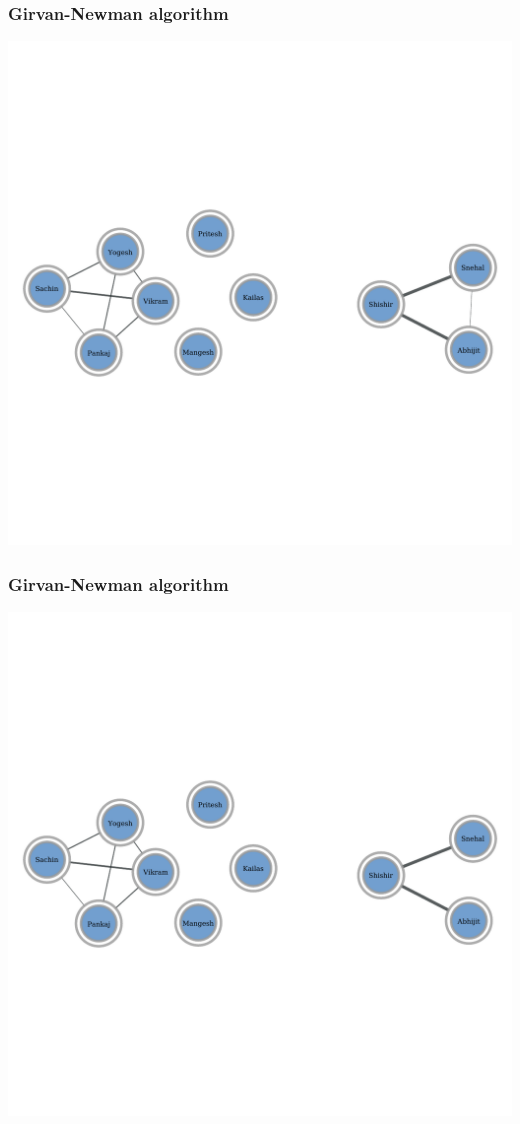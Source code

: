 \documentclass{beamer}
\begin{document}
\begin{frame}
    \frametitle{Girvan-Newman algorithm}
    \centering
    \includegraphics[width=0.8\columnwidth]{gn8.pdf}
\end{frame}
\begin{frame}
    \frametitle{Girvan-Newman algorithm}
    \centering
    \includegraphics[width=0.8\columnwidth]{gn9.pdf}
\end{frame}
\end{document}
